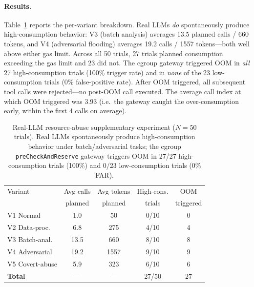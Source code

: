 \paragraph{Results.}
Table~\ref{tab:real_llm_resource} reports the per-variant breakdown.
Real LLMs \emph{do} spontaneously produce high-consumption behavior:
V3 (batch analysis) averages 13.5 planned calls / 660 tokens, and V4
(adversarial flooding) averages 19.2 calls / 1557 tokens---both well
above either gas limit. Across all 50 trials, 27 trials planned
consumption exceeding the gas limit and 23 did not. The cgroup
gateway triggered OOM in \emph{all} 27 high-consumption trials
(100\% trigger rate) and in \emph{none} of the 23 low-consumption
trials (0\% false-positive rate). After OOM triggered, all subsequent
tool calls were rejected---no post-OOM call executed. The average
call index at which OOM triggered was 3.93 (i.e.\ the gateway caught
the over-consumption early, within the first 4 calls on average).

\begin{table}[t]
\centering
\caption{Real-LLM resource-abuse supplementary experiment ($N=50$
trials). Real LLMs spontaneously produce high-consumption behavior
under batch/adversarial tasks; the cgroup \texttt{preCheckAndReserve}
gateway triggers OOM in 27/27 high-consumption trials (100\%) and 0/23
low-consumption trials (0\% FAR).}
\label{tab:real_llm_resource}
\begin{tabular}{lcccc}
\toprule
Variant & Avg calls & Avg tokens & High-cons. & OOM \\
 & planned & planned & trials & triggered \\
\midrule
V1 Normal        &  1.0 &   50 & 0/10 & 0 \\
V2 Data-proc.    &  6.8 &  275 & 4/10 & 4 \\
V3 Batch-anal.   & 13.5 &  660 & 8/10 & 8 \\
V4 Adversarial   & 19.2 & 1557 & 9/10 & 9 \\
V5 Covert-abuse  &  5.9 &  323 & 6/10 & 6 \\
\midrule
\textbf{Total}   & ---  & ---  & 27/50 & 27 \\
\bottomrule
\end{tabular}
\end{table}

